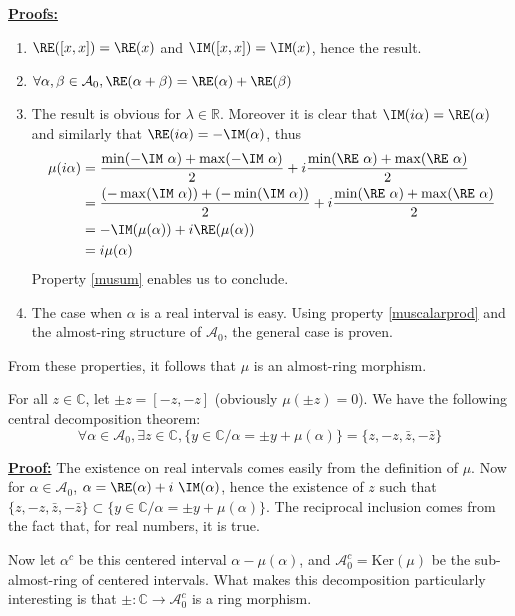 \noindent\underline{\textbf{Proofs:}}
\begin{enumerate}[i]
    \item $\RE([x, x]) = \RE(x)$ and $\IM([x, x]) = \IM(x)$, hence the result.
    \item $\forall \alpha, \beta \in \mathcal{A}_0, \RE(\alpha + \beta) = \RE(\alpha) + \RE(\beta)$
    \item The result is obvious for $\lambda \in \mathbb{R}$.
    Moreover it is clear that $\IM(i \alpha) = \RE(\alpha)$ and similarly that $\RE(i \alpha) = - \IM(\alpha)$, thus
    \begin{align*}
        \mu(i\alpha) &= \frac{\min(-\IM~\alpha) + \max(-\IM~\alpha)}{2} + i \frac{\min(\RE~\alpha) + \max(\RE~\alpha)}{2} \\
        &= \frac{(-\max(\IM~\alpha)) + (-\min(\IM~\alpha))}{2} + i \frac{\min(\RE~\alpha) + \max(\RE~\alpha)}{2} \\
        &= - \IM(\mu(\alpha)) + i \RE(\mu(\alpha)) \\
        &= i \mu(\alpha)
    \end{align*}
    Property \ref{musum} enables us to conclude.
    \item The case when $\alpha$ is a real interval is easy. Using property \ref{muscalarprod} and the almost-ring structure of $\mathcal{A}_0$, the general case is proven.
    \hfill{} $\boxed{}$
\end{enumerate}

\noindent From these properties, it follows that $\mu$ is an almost-ring morphism.

For all $z \in \mathbb{C}$, let $\pm z = [-z, -z]$ (obviously $\mu(\pm z) = 0$). We have the following central decomposition theorem:
$$\forall \alpha \in \mathcal{A}_0, \exists z \in \mathbb{C}, \{y \in \mathbb{C} / \alpha = \pm y + \mu(\alpha)\} = \{z, -z, \bar{z}, -\bar z\}$$

\noindent\underline{\textbf{Proof:}} The existence on real intervals comes easily from the definition of $\mu$.
Now for $\alpha \in \mathcal{A}_0$, $\alpha = \RE(\alpha) + i~\IM(\alpha)$, hence the existence of $z$ such that $\{z, -z, \bar{z}, -\bar z\} \subset \{y \in \mathbb{C} / \alpha = \pm y + \mu(\alpha)\}$.
The reciprocal inclusion comes from the fact that, for real numbers, it is true.

Now let $\alpha^c$ be this centered interval $\alpha - \mu(\alpha)$, and $\mathcal{A}_0^c = \text{Ker}(\mu)$ be the sub-almost-ring of centered intervals. What makes this decomposition particularly interesting is that $\pm : \mathbb{C} \rightarrow \mathcal{A}_0^c$ is a ring morphism.

